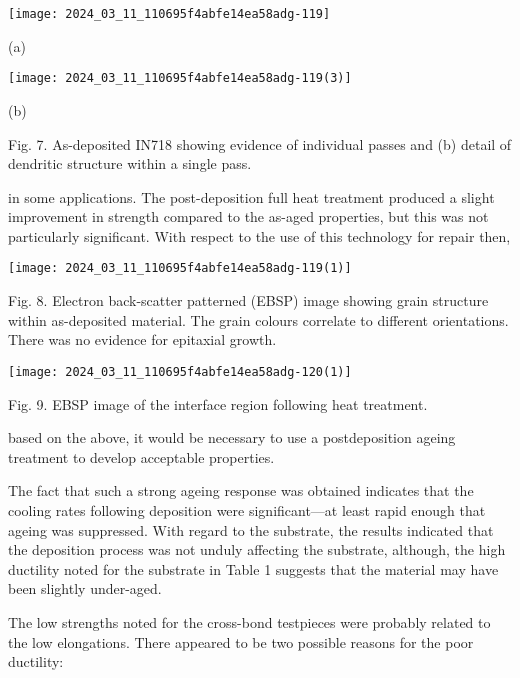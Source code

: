 \documentclass[10pt]{article}
\begin{document}
\begin{center}
\texttt{[image: 2024\_03\_11\_110695f4abfe14ea58adg-119]}
\end{center}

(a)

\begin{center}
\texttt{[image: 2024\_03\_11\_110695f4abfe14ea58adg-119(3)]}
\end{center}

(b)

Fig. 7. As-deposited IN718 showing evidence of individual passes and (b) detail of dendritic structure within a single pass.

in some applications. The post-deposition full heat treatment produced a slight improvement in strength compared to the as-aged properties, but this was not particularly significant. With respect to the use of this technology for repair then,

\begin{center}
\texttt{[image: 2024\_03\_11\_110695f4abfe14ea58adg-119(1)]}
\end{center}

Fig. 8. Electron back-scatter patterned (EBSP) image showing grain structure within as-deposited material. The grain colours correlate to different orientations. There was no evidence for epitaxial growth.

\begin{center}
\texttt{[image: 2024\_03\_11\_110695f4abfe14ea58adg-120(1)]}
\end{center}

Fig. 9. EBSP image of the interface region following heat treatment.

based on the above, it would be necessary to use a postdeposition ageing treatment to develop acceptable properties.

The fact that such a strong ageing response was obtained indicates that the cooling rates following deposition were significant—at least rapid enough that ageing was suppressed. With regard to the substrate, the results indicated that the deposition process was not unduly affecting the substrate, although, the high ductility noted for the substrate in Table 1 suggests that the material may have been slightly under-aged.

The low strengths noted for the cross-bond testpieces were probably related to the low elongations. There appeared to be two possible reasons for the poor ductility:
\end{document}
